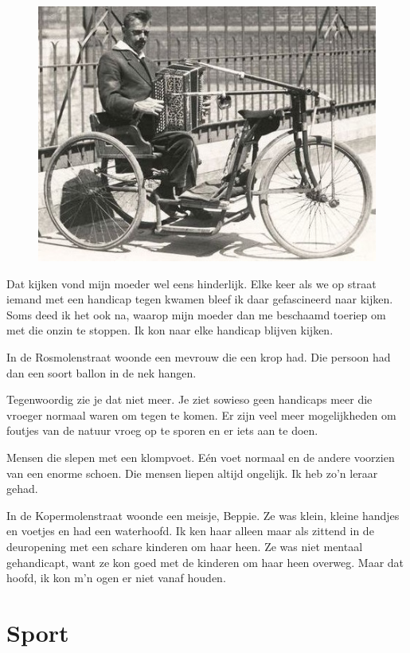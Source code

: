 \documentclass[12pt,twoside, openright]{memoir}
\begin{document}
\begin{figure}
\includegraphics[width=\textwidth]{img/ch10/rolstoel}
\end{figure}

Dat kijken vond mijn moeder wel eens hinderlijk. Elke keer als we op straat iemand met een handicap tegen kwamen bleef ik daar gefascineerd naar kijken. Soms deed ik het ook na, waarop mijn moeder dan me beschaamd toeriep om met die onzin te stoppen. Ik kon naar elke handicap blijven kijken.

In de Rosmolenstraat woonde een mevrouw die een krop had. Die persoon had dan een soort ballon in de nek hangen. 

Tegenwoordig zie je dat niet meer. Je ziet sowieso geen handicaps meer die vroeger normaal waren om tegen te komen. Er zijn veel meer mogelijkheden om foutjes van de natuur vroeg op te sporen en er iets aan te doen.

Mensen die slepen met een klompvoet. Eén voet normaal en de andere voorzien van een enorme schoen. Die mensen liepen altijd ongelijk. Ik heb zo’n leraar gehad.

In de Kopermolenstraat woonde een meisje, Beppie. Ze was klein, kleine handjes en voetjes en had een waterhoofd. Ik ken haar alleen maar als zittend in de deuropening met een schare kinderen om haar heen. Ze was niet mentaal gehandicapt, want ze kon goed met de kinderen om haar heen overweg. Maar dat hoofd, ik kon m’n ogen er niet vanaf houden.

\chapter{Sport} %
\label{cha:sport}
\end{document}
